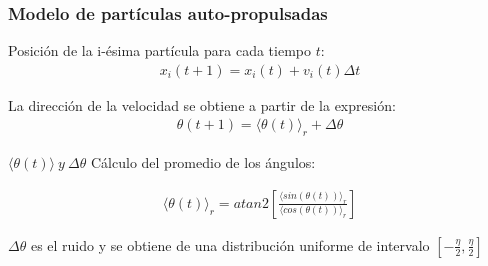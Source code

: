 %
\begin{frame}
\frametitle{Modelo de partículas auto-propulsadas}

Posición de la i-ésima partícula para cada tiempo $t$:
\begin{align}
     \boxed{x_i(t+1) = x_i(t) + v_i(t) \Delta t }
\end{align}

La dirección de la velocidad se obtiene a partir de la expresión:
\begin{align}
    \boxed{\theta (t+1) = \langle \theta (t) \rangle_r + \Delta \theta}
\end{align}

\begin{alertblock}{$\langle \theta (t) \rangle ~ y ~ \Delta \theta$}
Cálculo del promedio de los ángulos:

\begin{align}
 \langle \theta (t) \rangle_r  = atan2 \left[ \frac{\langle sin(\theta (t)) \rangle_r}{\langle cos(\theta (t)) \rangle_r} \right]
\end{align}

$\Delta \theta$ es el ruido y se obtiene de una distribución uniforme de intervalo $[-\frac{\eta}{2}, \frac{\eta}{2}]$

\end{alertblock}

\end{frame}

